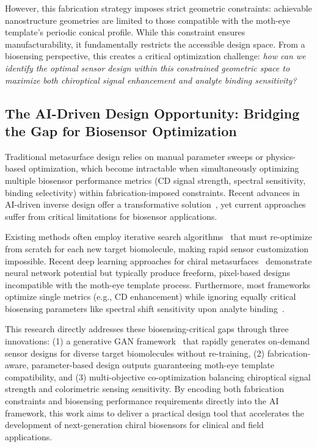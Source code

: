 \documentclass[12pt,a4paper]{article}
\begin{document}
However, this fabrication strategy imposes strict geometric constraints: achievable nanostructure geometries are limited to those compatible with the moth-eye template's periodic conical profile. While this constraint ensures manufacturability, it fundamentally restricts the accessible design space. From a biosensing perspective, this creates a critical optimization challenge: \textit{how can we identify the optimal sensor design within this constrained geometric space to maximize both chiroptical signal enhancement and analyte binding sensitivity?}

\subsection{The AI-Driven Design Opportunity: Bridging the Gap for Biosensor Optimization}
Traditional metasurface design relies on manual parameter sweeps or physics-based optimization, which become intractable when simultaneously optimizing multiple biosensor performance metrics (CD signal strength, spectral sensitivity, binding selectivity) within fabrication-imposed constraints. Recent advances in AI-driven inverse design offer a transformative solution~\cite{dl_nanophotonics_researching,ai_metasurface_vae_gan}, yet current approaches suffer from critical limitations for biosensor applications.

Existing methods often employ iterative search algorithms~\cite{ml_metaplasmonic_biosensors} that must re-optimize from scratch for each new target biomolecule, making rapid sensor customization impossible. Recent deep learning approaches for chiral metasurfaces~\cite{dl_3d_chiral_metasurfaces,dl_customized_chiral,nn_chiral_nanodimer} demonstrate neural network potential but typically produce freeform, pixel-based designs incompatible with the moth-eye template process. Furthermore, most frameworks optimize single metrics (e.g., CD enhancement) while ignoring equally critical biosensing parameters like spectral shift sensitivity upon analyte binding~\cite{inverse_chiroptical_response}.

This research directly addresses these biosensing-critical gaps through three innovations: (1) a generative GAN framework~\cite{conditional_gan_nanophotonics,generative_metasurface_umbc} that rapidly generates on-demand sensor designs for diverse target biomolecules without re-training, (2) fabrication-aware, parameter-based design outputs guaranteeing moth-eye template compatibility, and (3) multi-objective co-optimization balancing chiroptical signal strength and colorimetric sensing sensitivity. By encoding both fabrication constraints and biosensing performance requirements directly into the AI framework, this work aims to deliver a practical design tool that accelerates the development of next-generation chiral biosensors for clinical and field applications.
\end{document}
